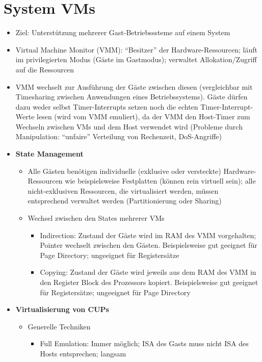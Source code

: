 \section{System VMs}
\begin{itemize}
	\item Ziel: Unterstützung mehrerer Gast-Betriebsssteme auf einem System
	\item Virtual Machine Monitor (VMM): "`Besitzer"' der Hardware-Ressourcen; läuft im privilegierten Modus (Gäste im Gastmodus); verwaltet Allokation/Zugriff auf die Ressourcen
	\item VMM wechselt zur Ausführung der Gäste zwischen diesen (vergleichbar mit Timesharing zwischen Anwendungen eines Betriebssystems). Gäste dürfen dazu weder selbst Timer-Interrupts setzen noch die echten Timer-Interrupt-Werte lesen (wird vom VMM emuliert), da der VMM den Host-Timer zum Wechseln zwischen VMs und dem Host verwendet wird (Probleme durch Manipulation: "`unfaire"' Verteilung von Rechenzeit, DoS-Angriffe)
	\item \textbf{State Management}
	\begin{itemize}
		\item Alle Gästen benötigen individuelle (exklusive oder versteckte) Hardware-Ressourcen wie beispielsweise Festplatten (können rein virtuell sein); alle nicht-exklusiven Ressourcen, die virtualisiert werden, müssen entsprechend verwaltet werden (Partitionierung oder Sharing)
		\item Wechsel zwischen den States mehrerer VMs
		\begin{itemize}
			\item Indirection: Zustand der Gäste wird im RAM des VMM vorgehalten; Pointer wechselt zwischen den Gästen. Beispielsweise gut geeignet für Page Directory; ungeeignet für Registersätze
			\item Copying: Zustand der Gäste wird jeweils aus dem RAM des VMM in den Register Block des Prozessors kopiert. Beispielsweise gut geeignet für Registersätze; ungeeignet für Page Directory
		\end{itemize}
	\end{itemize}
	\item \textbf{Virtualisierung von CUPs}
	\begin{itemize}
		\item Generelle Techniken
		\begin{itemize}
			\item Full Emulation: Immer möglich; ISA des Gasts muss nicht ISA des Hosts entsprechen; langsam

\end{itemize}
\end{itemize}
\end{itemize}
